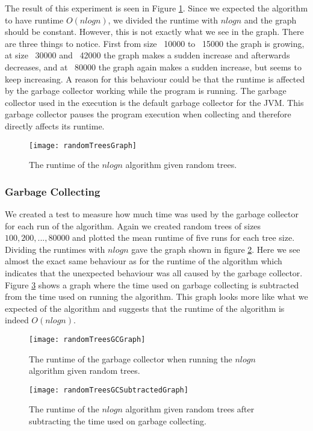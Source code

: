The result of this experiment is seen in Figure \ref{randomTreesGraph}. Since we expected the algorithm to have runtime $O(nlogn)$, we divided the runtime with $nlogn$ and the graph should be constant. However, this is not exactly what we see in the graph. There are three things to notice. First from size ~10000 to ~15000 the graph is growing, at size ~30000 and ~42000 the graph makes a sudden increase and afterwards decreases, and at ~80000 the graph again makes a sudden increase, but seems to keep increasing. A reason for this behaviour could be that the runtime is affected by the garbage collector working while the program is running. The garbage collector used in the execution is the default garbage collector for the JVM. This garbage collector pauses the program execution when collecting and therefore directly affects its runtime.

\begin{figure}
	\texttt{[image: randomTreesGraph]}
	\caption{The runtime of the $nlogn$ algorithm given random trees.}
	\label{randomTreesGraph}
\end{figure}

\subsubsection{Garbage Collecting}
We created a test to measure how much time was used by the garbage collector for each run of the algorithm. Again we created random trees of sizes $100, 200, ..., 80000$ and plotted the mean runtime of five runs for each tree size. Dividing the runtimes with $nlogn$ gave the graph shown in figure \ref{randomTreesGCGraph}. Here we see almost the exact same behaviour as for the runtime of the algorithm which indicates that the unexpected behaviour was all caused by the garbage collector. Figure \ref{randomTreesGCSubtractedGraph} shows a graph where the time used on garbage collecting is subtracted from the time used on running the algorithm. This graph looks more like what we expected of the algorithm and suggests that the runtime of the algorithm is indeed $O(nlogn)$.

\begin{figure}
	\texttt{[image: randomTreesGCGraph]}
	\caption{The runtime of the garbage collector when running the $nlogn$ algorithm given random trees.}
	\label{randomTreesGCGraph}
\end{figure}

\begin{figure}
	\texttt{[image: randomTreesGCSubtractedGraph]}
	\caption{The runtime of the $nlogn$ algorithm given random trees after subtracting the time used on garbage collecting.}
	\label{randomTreesGCSubtractedGraph}
\end{figure}

